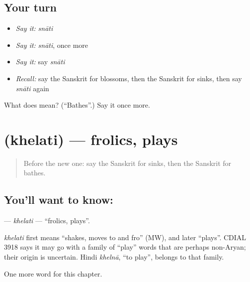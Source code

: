 \subsection*{Your turn}
\begin{itemize}
\raggedright
  \item \emph{Say it:} \emph{snāti}
  \item \emph{Say it:} \emph{snāti}, once more
  \item \emph{Say it:} say \emph{snāti}
  \item \emph{Recall:} say the Sanskrit for blossoms, then the Sanskrit for sinks, then say \emph{snāti} again
\end{itemize}

\begin{tcolorbox}[breakable,colback=teal!4,colframe=teal!35!black,title={Before you move on}]
What does  mean? (\textquotedblleft{}Bathes\textquotedblright{}.) Say it once more.
\end{tcolorbox}
\section[\texorpdfstring{\sk{खेलति} (khelati)}{खेलति (khelati)}]{ (khelati) — frolics, plays}

\label{lesson:SA-C206-khelati}



\begin{quote}
Before the new one: say the Sanskrit for sinks, then the Sanskrit for bathes.
\end{quote}

\subsection*{You'll want to know: }
\textbf{} — \emph{khelati} — \textquotedblleft{}frolics, plays\textquotedblright{}.

\begin{cousinweb}
\emph{khelati} first means \textquotedblleft{}shakes, moves to and fro\textquotedblright{} (MW), and later \textquotedblleft{}plays\textquotedblright{}. CDIAL 3918 says it may go with a family of \textquotedblleft{}play\textquotedblright{} words that are perhaps non-Aryan; their origin is uncertain. Hindi \emph{khelnā}, \textquotedblleft{}to play\textquotedblright{}, belongs to that family.
\end{cousinweb}

\begin{grammarlens}[title={What you've built}]
One more word for this chapter.
\end{grammarlens}

